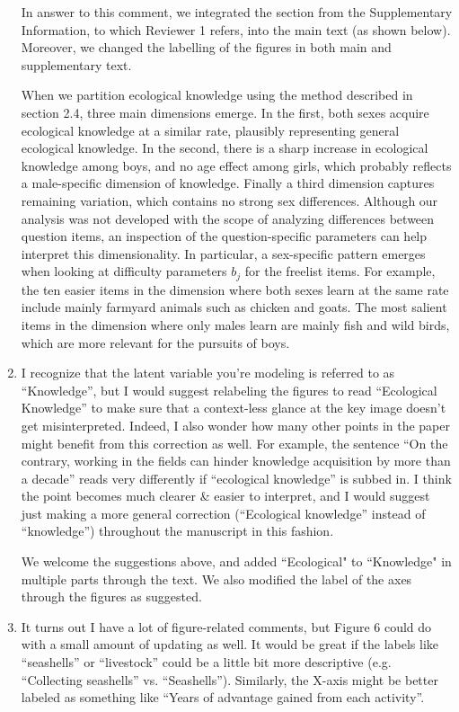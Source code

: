\documentclass{article}
\newcommand{\rev}[1]{{\color{Red}#1}}
\newcommand{\comment}[1]{{\color{Blue}#1}}
\begin{document}
\begin{enumerate}
    \comment{In answer to this comment, we integrated the section from the Supplementary Information, to which Reviewer 1 refers, into the main text (as shown below). Moreover, we changed the labelling of the figures in both main and supplementary text.}
    
\rev{When we partition ecological knowledge using the method described in section 2.4, three main dimensions emerge. In the first, both sexes acquire ecological knowledge at a similar rate, plausibly representing general ecological knowledge. In the second, there is a sharp increase in ecological knowledge among boys, and no age effect among girls, which probably reflects a male-specific dimension of knowledge. Finally a third dimension captures remaining variation, which contains no strong sex differences. Although our analysis was not developed with the scope of analyzing differences between question items, an inspection of the question-specific parameters can help interpret this dimensionality. In particular, a sex-specific pattern emerges when looking at difficulty parameters $b_j$ for the freelist items. For example, the ten easier items in the dimension where both sexes learn at the same rate include mainly farmyard animals such as chicken and goats. The most salient items in the dimension where only males learn are mainly fish and wild birds, which are more relevant for the pursuits of boys.}

    \item I recognize that the latent variable you’re modeling is referred to as ``Knowledge”, but I would suggest relabeling the figures to read ``Ecological Knowledge” to make sure that a context-less glance at the key image doesn’t get misinterpreted. Indeed, I also wonder how many other points in the paper might benefit from this correction as well. For example, the sentence ``On the contrary, working in the fields can hinder knowledge acquisition by more than a decade” reads very differently if ``ecological knowledge” is subbed in. I think the point becomes much clearer \& easier to interpret, and I would suggest just making a more general correction (``Ecological knowledge” instead of ``knowledge”) throughout the manuscript in this fashion.
    
    \comment{We welcome the suggestions above, and added ``Ecological" to ``Knowledge" in multiple parts through the text. We also modified the label of the axes through the figures as suggested.}

    \item It turns out I have a lot of figure-related comments, but Figure 6 could do with a small amount of updating as well. It would be great if the labels like “seashells” or “livestock” could be a little bit more descriptive (e.g. “Collecting seashells” vs. “Seashells”). Similarly, the X-axis might be better labeled as something like “Years of advantage gained from each activity”.
    

\end{enumerate}
\end{document}
